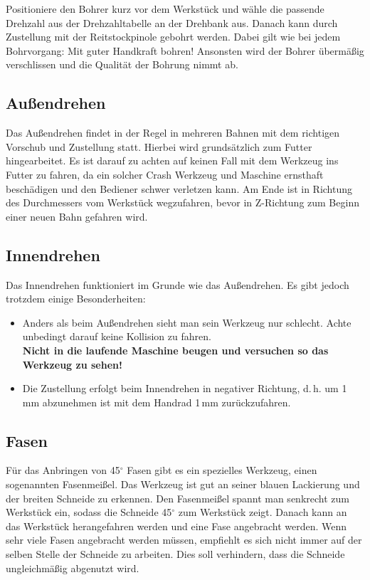 \documentclass{\basedir/fablab-document}
\begin{document}
Positioniere den Bohrer kurz vor dem Werkstück und wähle die passende Drehzahl aus der Drehzahltabelle an der Drehbank aus.
Danach kann durch Zustellung mit der Reitstockpinole gebohrt werden.
Dabei gilt wie bei jedem Bohrvorgang: Mit guter Handkraft bohren!
Ansonsten wird der Bohrer übermäßig verschlissen und die Qualität der Bohrung nimmt ab.

\subsection{Außendrehen} 

Das Außendrehen findet in der Regel in mehreren Bahnen mit dem richtigen Vorschub und Zustellung statt.
Hierbei wird grundsätzlich zum Futter hingearbeitet.
Es ist darauf zu achten auf keinen Fall mit dem Werkzeug ins Futter zu fahren, da ein solcher Crash Werkzeug und Maschine ernsthaft beschädigen und den Bediener schwer verletzen kann.
Am Ende ist in Richtung des Durchmessers vom Werkstück wegzufahren, bevor in Z-Richtung zum Beginn einer neuen Bahn gefahren wird.

\subsection{Innendrehen}

Das Innendrehen funktioniert im Grunde wie das Außendrehen. Es gibt jedoch trotzdem einige Besonderheiten:
\begin{itemize}
\item Anders als beim Außendrehen sieht man sein Werkzeug nur schlecht. Achte unbedingt darauf keine Kollision zu fahren.\\
\textbf{Nicht in die laufende Maschine beugen und versuchen so das Werkzeug zu sehen!}
\item Die Zustellung erfolgt beim Innendrehen in negativer Richtung, d.\,h. um 1\,mm abzunehmen ist mit dem Handrad 1\,mm zurückzufahren.
\end{itemize}

\subsection{Fasen}

Für das Anbringen von 45$^\circ$ Fasen gibt es ein spezielles Werkzeug, einen sogenannten Fasenmeißel.
Das Werkzeug ist gut an seiner blauen Lackierung und der breiten Schneide zu erkennen. 
Den Fasenmeißel spannt man senkrecht zum Werkstück ein, sodass die Schneide 45$^\circ$ zum Werkstück zeigt.
Danach kann an das Werkstück herangefahren werden und eine Fase angebracht werden.
Wenn sehr viele Fasen angebracht werden müssen, empfiehlt es sich nicht immer auf der selben Stelle der Schneide zu arbeiten.
Dies soll verhindern, dass die Schneide ungleichmäßig abgenutzt wird.
\end{document}
